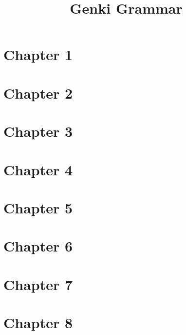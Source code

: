 \documentclass{article}
\title{Genki Grammar}
\makeatletter
\newcommand{\getCurrentSectionNumber}{%
  \ifnum\c@section=0 %
  \thechapter
  \else
  \ifnum\c@subsection=0 %
  \thesection
  \else
  \ifnum\c@subsubsection=0 %
  \thesubsection
  \else
  \thesubsubsection
  \fi
  \fi
  \fi
}
\newcommand{\inputchapter}[2]{\section{Chapter #1}\label{\getCurrentSectionNumber}}
\makeatother
\begin{document}
\tableofcontents

\inputchapter{1}{01.tex}
\inputchapter{2}{02.tex}
\inputchapter{3}{03.tex}
\inputchapter{4}{04.tex}
\inputchapter{5}{05.tex}
\inputchapter{6}{06.tex}
\inputchapter{7}{07.tex}
\inputchapter{8}{08.tex}
\end{document}
